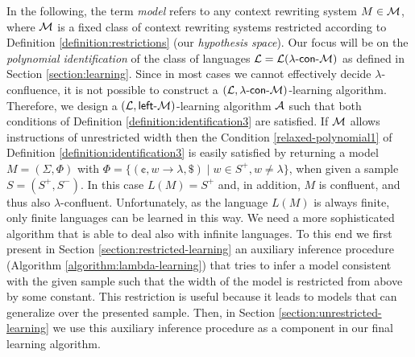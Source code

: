 In the following, the term \emph{model} refers to any context rewriting system $M \in \textup{\sf $\mathcal{M}$}$, where $\textup{\sf $\mathcal{M}$}$ is a fixed class of context rewriting systems restricted according to Definition \ref{definition:restrictions} (our \emph{hypothesis space}). Our focus will be on the \emph{polynomial identification} of the class of languages $\textup{\sf $\mathcal{L}$} = {\cal L}(\textup{\sf $\lambda$-con-\textup{\sf $\mathcal{M}$}})$ as defined in Section \ref{section:learning}. Since in most cases we cannot effectively decide $\lambda$-confluence, it is not possible to construct a $(\textup{\sf $\mathcal{L}$}, \textup{\sf $\lambda$-con-\textup{\sf $\mathcal{M}$}})$-learning algorithm. Therefore, we design a $(\textup{\sf $\mathcal{L}$}, \textup{\sf left-\textup{\sf $\mathcal{M}$}})$-learning algorithm $\textup{\sf $\mathcal{A}$}$ such that both conditions of Definition \ref{definition:identification3} are satisfied. If $\textup{\sf $\mathcal{M}$}$ allows instructions of unrestricted width then the Condition \ref{relaxed-polynomial1} of Definition \ref{definition:identification3} is easily satisfied by returning a model $M = (\Sigma, \Phi)$ with $\Phi = \{ (\cent, w \to \lambda, \$) \mid w \in S^+, w \neq \lambda \}$, when given a sample $S = (S^+, S^-)$. In this case $L(M) = S^+$ and, in addition, $M$ is confluent, and thus also $\lambda$-confluent. Unfortunately, as the language $L(M)$ is always finite, only finite languages can be learned in this way. We need a more sophisticated algorithm that is able to deal also with infinite languages. To this end we first present in Section \ref{section:restricted-learning} an auxiliary inference procedure (Algorithm \ref{algorithm:lambda-learning}) that tries to infer a model consistent with the given sample such that the width of the model is restricted from above by some constant. This restriction is useful because it leads to models that can generalize over the presented sample. Then, in Section \ref{section:unrestricted-learning} we use this auxiliary inference procedure as a component in our final learning algorithm.

